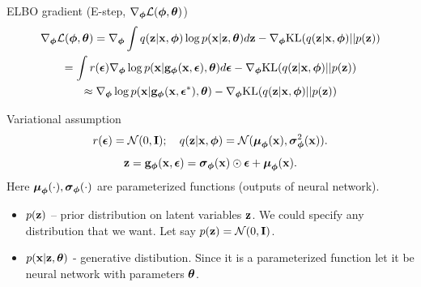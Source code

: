 \begin{frame}{ELBO gradient (E-step, $\nabla_{\bphi} \mathcal{L}(\bphi, \btheta)$)}
	\vspace{-0.5cm}
	\begin{multline*}
		\nabla_{\bphi} \mathcal{L} (\bphi, \btheta) = \nabla_{\bphi}\int q(\bz|\bx, \bphi) \log p(\bx| \bz, \btheta)  d\bz - \nabla_{\bphi} \text{KL}(q(\bz | \bx, \bphi) || p(\bz))
		\\ = \int r(\bepsilon) \nabla_{\bphi} \log p(\bx | \bg_{\bphi}(\bx, \bepsilon), \btheta) d\bepsilon  - \nabla_{\bphi} \text{KL}(q(\bz | \bx, \bphi) || p(\bz))
		\\ \approx \nabla_{\bphi} \log p(\bx | \bg_{\bphi}(\bx, \bepsilon^*), \btheta)  - \nabla_{\bphi} \text{KL}(q(\bz | \bx, \bphi) || p(\bz))
	\end{multline*}
	\vspace{-0.5cm}
	\begin{block}{Variational assumption}
		\vspace{-0.3cm}
		\[
			r(\bepsilon) = \mathcal{N}(0, \bI); \quad  q(\bz| \bx, \bphi) = \mathcal{N} (\bmu_{\bphi}(\bx), \bsigma^2_{\bphi}(\bx)).
		\]
		\[
			\bz = \bg_{\bphi}(\bx, \bepsilon) = \bsigma_{\bphi}(\bx) \odot \bepsilon + \bmu_{\bphi}(\bx).
		\]
		Here $\bmu_{\bphi}(\cdot), \bsigma_{\bphi}(\cdot)$ are parameterized functions (outputs of neural network).
	\end{block}
	\begin{itemize}
		\item $p(\bz)$ -- prior distribution on latent variables $\bz$. We could specify any distribution that we want. Let say $p(\bz) = \cN (0, \bI)$.
		\item $p(\bx | \bz, \btheta)$ - generative distibution. Since it is a parameterized function let it be neural network with parameters $\btheta$.
	\end{itemize}
\end{frame}
